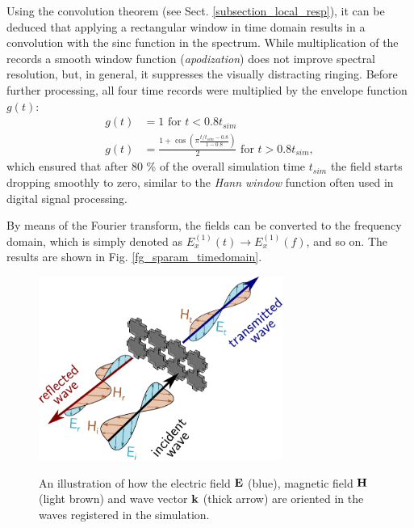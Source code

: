 Using the convolution theorem (see Sect. \ref{subsection_local_resp}), it can be deduced that applying a rectangular window in time domain results in a convolution with the sinc function in the spectrum. While multiplication of the records a  smooth window function (\textit{apodization}) does not improve spectral resolution, but, in general, it suppresses the visually distracting ringing. Before further processing, all four time records were multiplied by the envelope function $g(t)$:
\begin{equation} 
\begin{split}
	g(t) 	& = 1 \text{ for } t < 0.8 t_{sim} \\
	g(t)    & = \frac{1 + \cos\left(\pi \frac{t/t_{sim}-0.8}{1-0.8}\right)}{2}  \text{ for } t > 0.8 t_{sim},
\end{split}
\label{eq_envelope}\end{equation}
which ensured that after 80 \% of the overall simulation time $t_{sim}$ the field starts dropping smoothly to zero, similar to the \textit{Hann window} function often used in digital signal processing. %

By means of the Fourier transform, the fields can be converted to the frequency domain, which is simply denoted as $E_{x}^{(1)}(t) \rightarrow E_{x}^{(1)}(f)$, and so on. The results are shown in Fig. \ref{fg_sparam_timedomain}. 
\begin{figure}[ht] \caption{An illustration of how the electric field $\mathbf{E}$ (blue), magnetic field $\mathbf{H}$ (light brown) and wave vector ${\mathbf{k}}$ (thick arrow) are oriented in the waves registered in the simulation.}  \centering \includegraphics[width=8cm]{img/sim_separating_wave.pdf} \label{fg_separating_wave}\end{figure}

